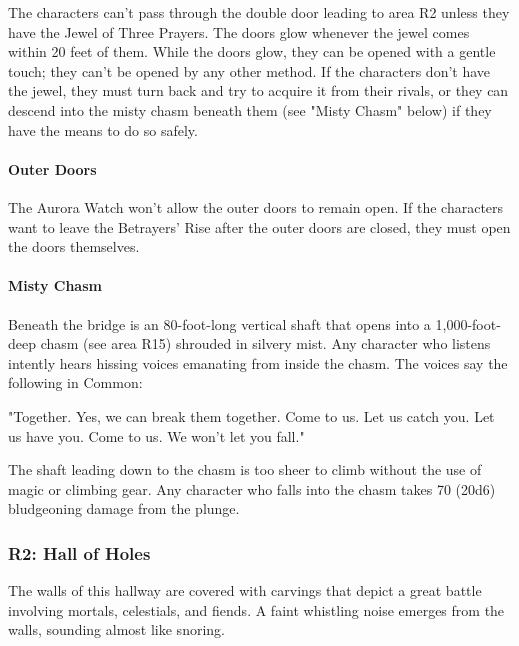 \documentclass[10pt,a4paper,twoside,bg=print,twocolumn,openany,nodeprecatedcode]{dndbook}
\begin{document}
The characters can't pass through the double door leading to area R2 unless they have the Jewel of Three Prayers. The doors glow whenever the jewel comes within 20 feet of them. While the doors glow, they can be opened with a gentle touch; they can't be opened by any other method. If the characters don't have the jewel, they must turn back and try to acquire it from their rivals, or they can descend into the misty chasm beneath them (see "Misty Chasm" below) if they have the means to do so safely.

\paragraph{Outer Doors}
The Aurora Watch won't allow the outer doors to remain open. If the characters want to leave the Betrayers' Rise after the outer doors are closed, they must open the doors themselves.

\paragraph{Misty Chasm}
Beneath the bridge is an 80-foot-long vertical shaft that opens into a 1,000-foot-deep chasm (see area R15) shrouded in silvery mist. Any character who listens intently hears hissing voices emanating from inside the chasm. The voices say the following in Common:

\begin{DndReadAloud}{}
"Together. Yes, we can break them together. Come to us. Let us catch you. Let us have you. Come to us. We won't let you fall."

\end{DndReadAloud}

The shaft leading down to the chasm is too sheer to climb without the use of magic or climbing gear. Any character who falls into the chasm takes 70 (20d6) bludgeoning damage from the plunge.

\subsubsection{R2: Hall of Holes}
\begin{DndReadAloud}{}
The walls of this hallway are covered with carvings that depict a great battle involving mortals, celestials, and fiends. A faint whistling noise emerges from the walls, sounding almost like snoring.

\end{DndReadAloud}
\end{document}
